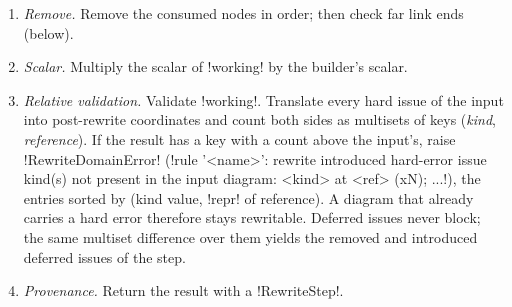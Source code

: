 \begin{algorithm}
\begin{enumerate}
  consumed node. Require the wire count to equal (input wire count) $-$ (distinct consumed wires)
  $+$ (distinct new wires), else raise \py!RewriteGrammarError!. Rebuild both boundary lists
  through the same endpoint remap, position by position.
\item \emph{Remove.} Remove the consumed nodes in order; then check far link ends (below).
\item \emph{Scalar.} Multiply the scalar of \py!working! by the builder's scalar.
\item \emph{Relative validation.} Validate \py!working!. Translate every hard issue of the input
  into post-rewrite coordinates and count both sides as multisets of keys
  (\emph{kind}, \emph{reference}). If the result has a key with a count above the input's, raise
  \py!RewriteDomainError! (\code!rule '<name>': rewrite introduced hard-error issue kind(s) not present in the input diagram: <kind> at <ref> (xN); ...!), the entries sorted by (kind value,
  \py!repr! of reference). A diagram that already carries a hard error therefore stays rewritable.
  Deferred issues never block; the same multiset difference over them yields the removed and
  introduced deferred issues of the step.
\item \emph{Provenance.} Return the result with a \py!RewriteStep!.
\end{enumerate}
\end{algorithm}


